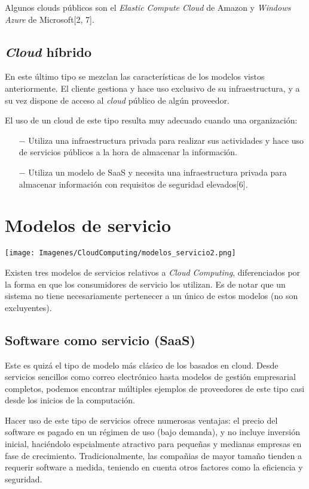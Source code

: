 Algunos clouds p\'ublicos son el \textit{Elastic Compute Cloud} de Amazon y \textit{Windows Azure} de Microsoft[2,
7].

\subsection{\textit{Cloud} h\'ibrido}

En este \'ultimo tipo se mezclan las caracter\'isticas de los modelos vistos anteriormente. El cliente gestiona y hace uso exclusivo de su infraestructura, y a su vez dispone de acceso al \textit{cloud} p\'ublico de alg\'un proveedor.

El uso de un cloud de este tipo resulta muy adecuado cuando una organizaci\'on:
\begin{itemize}
\item[$-$] Utiliza una infraestructura privada para realizar sus actividades y hace uso de servicios p\'ublicos a la hora de almacenar la informaci\'on.
\item[$-$] Utiliza un modelo de SaaS y necesita una infraestructura privada para almacenar informaci\'on con requisitos de seguridad elevados[6].
\end{itemize}

\section{Modelos de servicio}

\texttt{[image: Imagenes/CloudComputing/modelos\_servicio2.png]}

Existen tres modelos de servicios relativos a \textit{Cloud Computing}, diferenciados por la forma en que los consumidores de servicio los utilizan. Es de notar que un sistema no tiene  necesariamente pertenecer a un \'unico de estos modelos (no son excluyentes).

\subsection{Software como servicio (SaaS)}

Este es quiz\'a el tipo de modelo m\'as cl\'asico de los basados en cloud. Desde servicios sencillos como correo electr\'onico hasta modelos de gesti\'on empresarial completos, podemos encontrar m\'ultiples ejemplos de proveedores de este tipo casi desde los inicios de la computaci\'on.

Hacer uso de este tipo de servicios ofrece numerosas ventajas: el precio del software es pagado en un r\'egimen de uso (bajo demanda), y no incluye inversi\'on inicial, haci\'endolo espcialmente atractivo para peque\~nas y medianas empresas en fase de crecimiento. Tradicionalmente, las compa\~nias de mayor tama\~no tienden a requerir software a medida, teniendo en cuenta otros factores como la eficiencia y seguridad.

